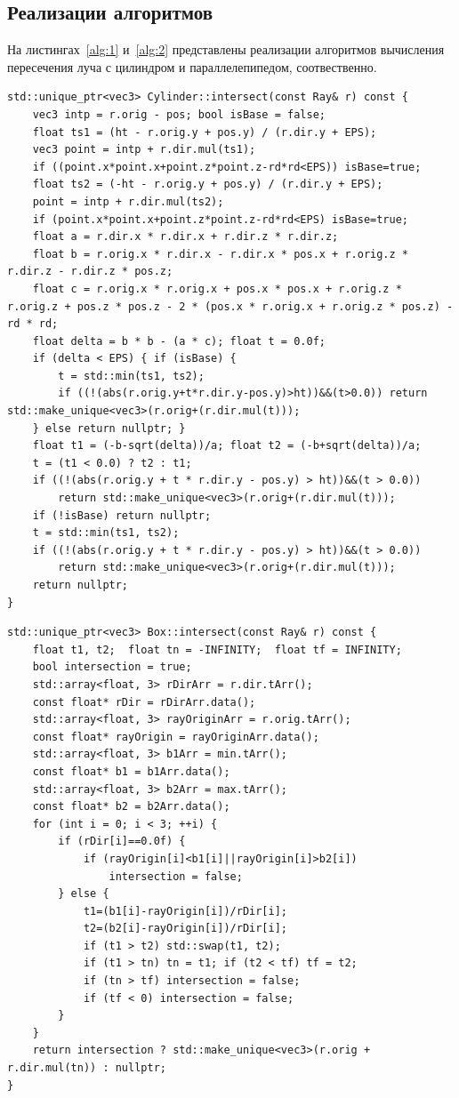 \newpage
\subsection{Реализации алгоритмов}

На листингах~\ref{alg:1} и~\ref{alg:2} представлены реализации алгоритмов вычисления пересечения луча с цилиндром и параллелепипедом, соотвественно.

\begin{lstlisting}[label=alg:1, caption=Реализация алгоритма поиска пересечения~луча~с~цилиндром, captionpos=t]
std::unique_ptr<vec3> Cylinder::intersect(const Ray& r) const {
	vec3 intp = r.orig - pos; bool isBase = false;
	float ts1 = (ht - r.orig.y + pos.y) / (r.dir.y + EPS);
	vec3 point = intp + r.dir.mul(ts1);
	if ((point.x*point.x+point.z*point.z-rd*rd<EPS)) isBase=true;
	float ts2 = (-ht - r.orig.y + pos.y) / (r.dir.y + EPS);
	point = intp + r.dir.mul(ts2);
	if (point.x*point.x+point.z*point.z-rd*rd<EPS) isBase=true;
	float a = r.dir.x * r.dir.x + r.dir.z * r.dir.z;
	float b = r.orig.x * r.dir.x - r.dir.x * pos.x + r.orig.z * r.dir.z - r.dir.z * pos.z;
	float c = r.orig.x * r.orig.x + pos.x * pos.x + r.orig.z * r.orig.z + pos.z * pos.z - 2 * (pos.x * r.orig.x + r.orig.z * pos.z) - rd * rd;
	float delta = b * b - (a * c); float t = 0.0f;
	if (delta < EPS) { if (isBase) {
		t = std::min(ts1, ts2);
		if ((!(abs(r.orig.y+t*r.dir.y-pos.y)>ht))&&(t>0.0)) return std::make_unique<vec3>(r.orig+(r.dir.mul(t)));
	} else return nullptr; }
	float t1 = (-b-sqrt(delta))/a; float t2 = (-b+sqrt(delta))/a;
	t = (t1 < 0.0) ? t2 : t1;
	if ((!(abs(r.orig.y + t * r.dir.y - pos.y) > ht))&&(t > 0.0))
		return std::make_unique<vec3>(r.orig+(r.dir.mul(t)));
	if (!isBase) return nullptr;
	t = std::min(ts1, ts2);
	if ((!(abs(r.orig.y + t * r.dir.y - pos.y) > ht))&&(t > 0.0))
		return std::make_unique<vec3>(r.orig+(r.dir.mul(t)));
	return nullptr;
}
\end{lstlisting}

\begin{lstlisting}[label=alg:2, caption=Реализация алгоритма поиска пересечения луча с параллелепипедом, captionpos=t]
std::unique_ptr<vec3> Box::intersect(const Ray& r) const {
	float t1, t2;  float tn = -INFINITY;  float tf = INFINITY; 
	bool intersection = true;
	std::array<float, 3> rDirArr = r.dir.tArr();
	const float* rDir = rDirArr.data();
	std::array<float, 3> rayOriginArr = r.orig.tArr();
	const float* rayOrigin = rayOriginArr.data();
	std::array<float, 3> b1Arr = min.tArr();
	const float* b1 = b1Arr.data();
	std::array<float, 3> b2Arr = max.tArr();
	const float* b2 = b2Arr.data();
	for (int i = 0; i < 3; ++i) {
		if (rDir[i]==0.0f) { 
			if (rayOrigin[i]<b1[i]||rayOrigin[i]>b2[i])
				intersection = false;
		} else {
			t1=(b1[i]-rayOrigin[i])/rDir[i]; 
			t2=(b2[i]-rayOrigin[i])/rDir[i];
			if (t1 > t2) std::swap(t1, t2);
			if (t1 > tn) tn = t1; if (t2 < tf) tf = t2;
			if (tn > tf) intersection = false;
			if (tf < 0) intersection = false;
		}
	}
	return intersection ? std::make_unique<vec3>(r.orig + r.dir.mul(tn)) : nullptr;
}
\end{lstlisting}

